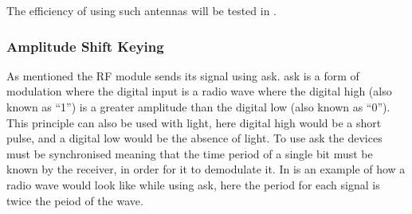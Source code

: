 The efficiency of using such antennas will be tested in .

\subsubsection{Amplitude Shift Keying}

As mentioned the RF module sends its signal using \gls{ask}.
\gls{ask} is a form of modulation where the digital input is a radio wave where the digital high (also known as ``1'') is a greater amplitude than the digital low (also known as ``0'').
This principle can also be used with light, here digital high would be a short pulse, and a digital low would be the absence of light. 
To use \gls{ask} the devices must be synchronised meaning that the time period of a single bit must be known by the receiver, in order for it to demodulate it. 
In  is an example of how a radio wave would look like while using \gls{ask}, here the period for each signal is twice the peiod of the wave. \cite{ASKnFSK}

